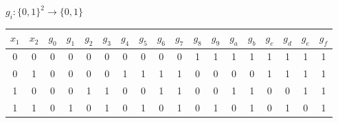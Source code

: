 \documentclass{iansnotes}
\begin{document}
$g_i : \{0,1\}^2 \rightarrow \{0,1\}$
\vspace{4mm}

\begin{tabular}{cc|cccccccccccccccc}
  $x_1$ & $x_2$ & $g_0$ & $g_1$ & $g_2$ & $g_3$ & $g_4$ & $g_5$ & $g_6$ & $g_7$ & $g_8$ & $g_9$ & $g_a$ & $g_b$ & $g_c$ & $g_d$ & $g_e$ & $g_f$ \\
  \midrule
  0 & 0 & 0 & 0 & 0 & 0 & 0 & 0 & 0 & 0 & 1 & 1 & 1 & 1 & 1 & 1 & 1 & 1 \\
  0 & 1 & 0 & 0 & 0 & 0 & 1 & 1 & 1 & 1 & 0 & 0 & 0 & 0 & 1 & 1 & 1 & 1 \\
  1 & 0 & 0 & 0 & 1 & 1 & 0 & 0 & 1 & 1 & 0 & 0 & 1 & 1 & 0 & 0 & 1 & 1 \\
  1 & 1 & 0 & 1 & 0 & 1 & 0 & 1 & 0 & 1 & 0 & 1 & 0 & 1 & 0 & 1 & 0 & 1 \\
\end{tabular}
\end{document}

